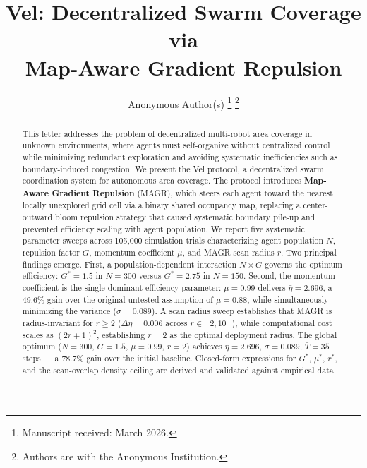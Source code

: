 \documentclass[journal,twoside,letterpaper]{IEEEtran}
\begin{document}
\title{Vel: Decentralized Swarm Coverage via\\Map-Aware Gradient Repulsion}

\author{Anonymous Author(s)
\thanks{Manuscript received: March 2026.}
\thanks{Authors are with the Anonymous Institution.}
}

\maketitle

\begin{abstract}
This letter addresses the problem of decentralized multi-robot area coverage in 
unknown environments, where agents must self-organize without centralized control 
while minimizing redundant exploration and avoiding systematic inefficiencies such 
as boundary-induced congestion. We present the Vel protocol, a decentralized 
swarm coordination system for autonomous area coverage. 
The protocol introduces \textbf{Map-Aware Gradient Repulsion} (MAGR), which steers 
each agent toward the nearest locally unexplored
grid cell via a binary shared occupancy map, replacing a center-outward bloom
repulsion strategy that caused systematic boundary pile-up and prevented efficiency scaling
with agent population. We report five systematic parameter sweeps across 105,000
simulation trials characterizing agent population $N$, repulsion factor $G$,
momentum coefficient $\mu$, and MAGR scan radius $r$. Two principal findings
emerge. First, a population-dependent interaction $N \times G$ governs the
 optimum efficiency: $G^* = 1.5$ in $N=300$ versus $G^* = 2.75$ in $N=150$.
Second, the momentum coefficient is the single dominant efficiency parameter:
$\mu = 0.99$ delivers $\bar{\eta} = 2.696$, a $49.6\%$ gain over the original
untested assumption of $\mu = 0.88$, while simultaneously minimizing the variance
($\sigma = 0.089$). A scan radius sweep establishes that MAGR is radius-invariant
for $r \geq 2$ ($\Delta\eta = 0.006$ across $r \in [2,10]$), while computational
cost scales as $(2r+1)^2$, establishing $r=2$ as the optimal deployment radius.
The global optimum ($N=300$, $G=1.5$, $\mu=0.99$, $r=2$) achieves
$\bar{\eta}=2.696$, $\sigma=0.089$, $\bar{T}=35$ steps — a $78.7\%$ gain over
the initial baseline. Closed-form expressions for $G^*$, $\mu^*$, $r^*$, and the
scan-overlap density ceiling are derived and validated against empirical data.
\end{abstract}
\end{document}
